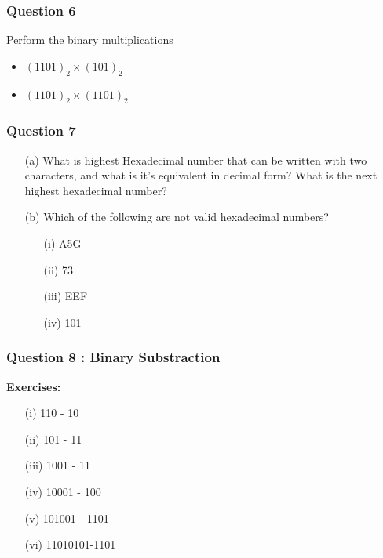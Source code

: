\documentclass[]{report}
\begin{document}
\begin{enumerate}
\subsubsection*{Question 6}

Perform the binary multiplications
\begin{itemize}
\item $(1101)_2 \times (101)_2$
\item $(1101)_2 \times (1101)_2$
\end{itemize}


\subsubsection*{Question 7}
\begin{itemize}


\item[(a)] What is highest Hexadecimal number that can be written with two characters, and what is it's equivalent in decimal form?
What is the next highest hexadecimal number?

\item[(b)] Which of the following are not valid hexadecimal numbers?

\begin{multicols}{2}
\begin{itemize}
\item[(i)] A5G 
\item[(ii)] 73 
\item[(iii)] EEF
\item[(iv)] 101
\end{itemize}
\end{multicols}
\end{itemize}



\subsubsection*{Question 8 : Binary Substraction}
\textbf{Exercises:}

\begin{multicols}{2}
\begin{itemize}
\item[(i)] 110 - 10
\item[(ii)] 101 - 11  
\item[(iii)] 1001 - 11
\item[(iv)] 10001 - 100 
\item[(v)] 101001 - 1101
\item[(vi)] 11010101-1101
\end{itemize}
\end{multicols}




\end{enumerate}
\end{document}
